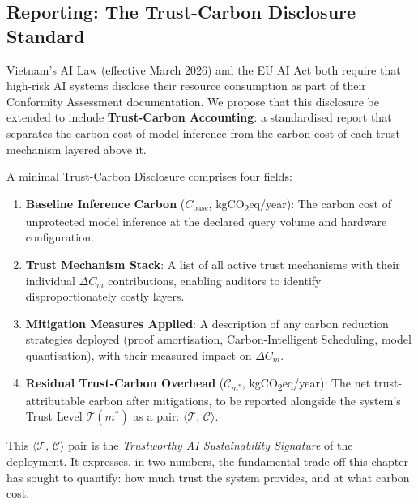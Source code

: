 \subsection{Reporting: The Trust-Carbon Disclosure Standard}
\label{subsec:trust-carbon-disclosure}

Vietnam's AI Law (effective March 2026) and the EU AI Act both
require that high-risk AI systems disclose their resource
consumption as part of their Conformity Assessment documentation.
We propose that this disclosure be extended to include
\textbf{Trust-Carbon Accounting}: a standardised report that
separates the carbon cost of model inference from the carbon
cost of each trust mechanism layered above it.

A minimal Trust-Carbon Disclosure comprises four fields:

\begin{enumerate}
  \item \textbf{Baseline Inference Carbon}
    ($C_{\mathrm{base}}$, kgCO\textsubscript{2}eq/year):
    The carbon cost of unprotected model inference at the
    declared query volume and hardware configuration.

  \item \textbf{Trust Mechanism Stack}:
    A list of all active trust mechanisms with their individual
    $\Delta C_m$ contributions, enabling auditors to identify
    disproportionately costly layers.

  \item \textbf{Mitigation Measures Applied}:
    A description of any carbon reduction strategies deployed
    (proof amortisation, Carbon-Intelligent Scheduling, model
    quantisation), with their measured impact on $\Delta C_m$.

  \item \textbf{Residual Trust-Carbon Overhead}
    ($\mathcal{C}_{m^*}$, kgCO\textsubscript{2}eq/year):
    The net trust-attributable carbon after mitigations,
    to be reported alongside the system's Trust Level
    $\mathcal{T}(m^*)$ as a pair:
    $\langle \mathcal{T},\, \mathcal{C} \rangle$.
\end{enumerate}

This $\langle \mathcal{T},\, \mathcal{C} \rangle$ pair is the
\emph{Trustworthy AI Sustainability Signature} of the deployment.
It expresses, in two numbers, the fundamental trade-off this
chapter has sought to quantify: how much trust the system
provides, and at what carbon cost.

